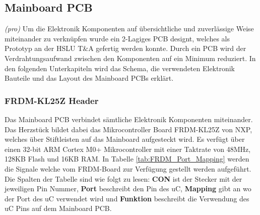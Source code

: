 \subsection{Mainboard PCB}
\textit{(pro)} Um die Elektronik Komponenten auf übersichtliche und zuverlässige Weise miteinander zu verknüpfen wurde ein 2-Lagiges PCB designt, welches als Prototyp an der HSLU T\&A gefertig werden konnte. Durch ein PCB wird der Verdrahtungsaufwand zwischen den Komponenten auf ein Minimum reduziert. In den folgenden Unterkapiteln wird das Schema, die verwendeten Elektronik Bauteile und das Layout des Mainboard PCBs erklärt.
\subsubsection{FRDM-KL25Z Header}
Das Mainboard PCB verbindet sämtliche Elektronik Komponenten miteinander. Das Herzstück bildet dabei das Mikrocontroller Board FRDM-KL25Z von NXP, welches über Stiftleisten auf das Mainboard aufgesteckt wird. Es verfügt über einen 32-bit ARM Cortex M0+ Mikrocontroller mit einer Taktrate von 48MHz, 128KB Flash und 16KB RAM. In Tabelle \ref{tab:FRDM_Port_Mapping} werden die Signale welche vom FRDM-Board zur Verfügung gestellt werden aufgeführt. Die Spalten der Tabelle sind wie folgt zu lesen: \textbf{CON} ist der Stecker mit der jeweiligen Pin Nummer, \textbf{Port} beschreibt den Pin des uC, \textbf{Mapping} gibt an wo der Port des uC verwendet wird und \textbf{Funktion} beschreibt die Verwendung des uC Pins auf dem Mainboard PCB.

